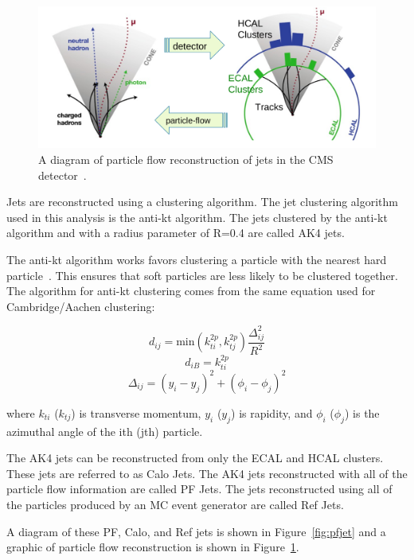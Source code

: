 \begin{figure}[h]
\centering
\includegraphics[width=1.0\textwidth]{figures/particle_flow_pandolfi}
\caption{A diagram of particle flow reconstruction of jets in the CMS detector~\cite{pflow_pandolfi}.}
\label{fig:pflow_jets}
\end{figure}

Jets are reconstructed using a clustering algorithm. The jet clustering algorithm used in this analysis is the anti-kt algorithm. The jets clustered by the anti-kt algorithm and with a radius parameter of R=0.4 are called AK4 jets. 

The anti-kt algorithm works favors clustering a particle with the nearest hard particle~\cite{anti-kt}. This ensures that soft particles are less likely to be clustered together. The algorithm for anti-kt clustering comes from the same equation used for Cambridge/Aachen clustering:

\begin{equation}
	d_{ij} = \text{min} \left( k^{2p}_{ti}, k^{2p}_{tj} \right) \frac{\Delta^2_{ij}}{R^2}
\end{equation}
\begin{equation}
	d_{iB} = k^{2p}_{ti}
\end{equation}
\begin{equation}
	\Delta_{ij} = (y_i - y_j)^2 + (\phi_i - \phi_j)^2
\end{equation}

where $k_{ti}$ ($k_{tj}$) is transverse momentum, $y_i$ ($y_j$) is rapidity, and $\phi_i$ ($\phi_j$) is the azimuthal angle of the ith (jth) particle.

The AK4 jets can be reconstructed from only the ECAL and HCAL clusters. These jets are referred to as Calo Jets. The AK4 jets reconstructed with all of the particle flow information are called PF Jets. The jets reconstructed using all of the particles produced by an MC event generator are called Ref Jets. 


A diagram of these PF, Calo, and Ref jets is shown in Figure~\ref{fig:pfjet} and a graphic of particle flow reconstruction is shown in Figure~\ref{fig:pflow_jets}.


